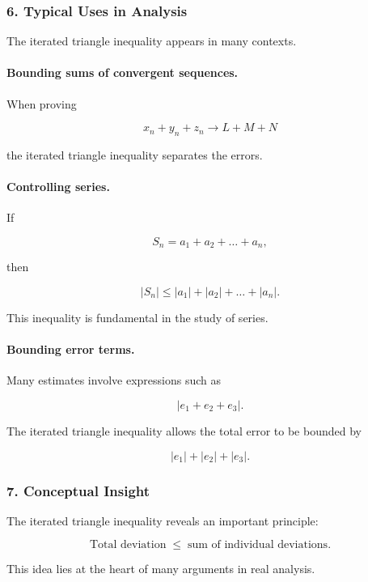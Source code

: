 \bigskip

\subsubsection*{6. Typical Uses in Analysis}

The iterated triangle inequality appears in many contexts.

\paragraph{Bounding sums of convergent sequences.}

When proving

\[
x_n + y_n + z_n \to L + M + N
\]

the iterated triangle inequality separates the errors.

\paragraph{Controlling series.}

If

\[
S_n = a_1 + a_2 + \dots + a_n,
\]

then

\[
|S_n|
\le
|a_1| + |a_2| + \dots + |a_n|.
\]

This inequality is fundamental in the study of series.

\paragraph{Bounding error terms.}

Many estimates involve expressions such as

\[
|e_1 + e_2 + e_3|.
\]

The iterated triangle inequality allows the total error to be bounded by

\[
|e_1| + |e_2| + |e_3|.
\]

\bigskip

\subsubsection*{7. Conceptual Insight}

The iterated triangle inequality reveals an important principle:

\[
\text{Total deviation}
\;\le\;
\text{sum of individual deviations}.
\]

This idea lies at the heart of many arguments in real analysis.

